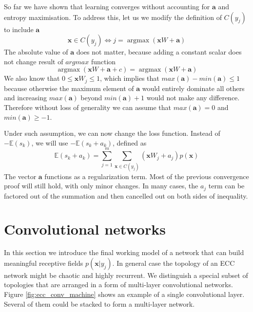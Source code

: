 \documentclass[12pt]{article}
\DeclareMathOperator*{\argmax}{argmax}
\begin{document}
So far we have shown that learning converges without accounting for $\boldsymbol{a}$ and entropy maximisation. To address this, let us we modify the definition of $C(y_j)$ to include $\boldsymbol{a}$ 
\[
\boldsymbol{x} \in C(y_j) \iff  j = \argmax(\boldsymbol{x} W + \boldsymbol{a})
\]
The absolute value of $\boldsymbol{a}$ does not matter, because adding a constant scalar does not change result of $argmax$ function  
\[
\argmax(\boldsymbol{x} W + \boldsymbol{a} + c)  = \argmax(\boldsymbol{x} W + \boldsymbol{a} )
\]
We also know that $0 \le \boldsymbol{x} W_j \le 1$, which implies that $max(\boldsymbol{a})-min(\boldsymbol{a})\le 1$ because otherwise the maximum element of $\boldsymbol{a}$ would entirely dominate all others and increasing $max(\boldsymbol{a})$ beyond $min(\boldsymbol{a})+1$ would not make any difference. Therefore without loss of generality we can assume that $max(\boldsymbol{a})=0$ and $min(\boldsymbol{a})\ge -1$.

Under such assumption, we can now change the loss function. Instead of $-\mathbb{E}(s_k)$, we will use 
$-\mathbb{E}(s_k+a_k)$, defined as
\[
\mathbb{E}(s_k+a_k) = \sum_{j=1}^{m} \sum_{\boldsymbol{x}\in C(y_j)} (\boldsymbol{x}W_j +a_j)p(\boldsymbol{x})
\]
The vector $\boldsymbol{a}$ functions as a regularization term. Most of the previous convergence proof will still hold, with only minor changes. In many cases, the $a_j$ term can be factored out of the summation and then cancelled out on both sides of inequality. 



\section{Convolutional networks}

In this section we introduce the final working model of a network that can build meaningful receptive fields $p(\boldsymbol{x}|y_j)$. In general case the topology of an ECC network might be chaotic and highly recurrent. We distinguish a special subset of topologies that are arranged in a form of multi-layer convolutional networks. Figure \ref{fig:ecc_conv_machine} shows an example of a single convolutional layer. Several of them could be stacked to form a multi-layer network. 
\end{document}
